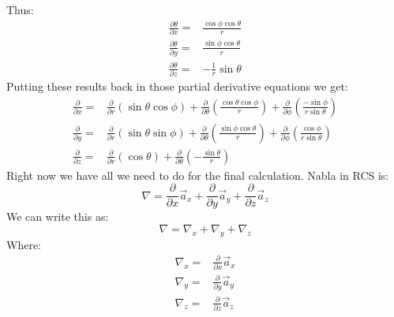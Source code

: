                 Thus:
                \begin{align}
                    \frac{\partial\theta}{\partial x} = & \frac{\cos\phi\cos\theta}{r} \\
                    \frac{\partial\theta}{\partial y} = & \frac{\sin\phi\cos\theta}{r} \\
                    \frac{\partial\theta}{\partial z} = & -\frac{1}{r}\sin\theta
                \end{align}
                Putting these results back in those partial derivative equations we get:
                \begin{align}
                    \frac{\partial}{\partial x} = & \frac{\partial}{\partial r}\left(\sin\theta\cos\phi\right) 
                                                + \frac{\partial}{\partial \theta}\left(\frac{\cos\theta\cos\phi}{r}\right)
                                                + \frac{\partial}{\partial \phi}\left(\frac{-\sin\phi}{r\sin\theta}\right) \\
                    \frac{\partial}{\partial y} = & \frac{\partial}{\partial r}\left(\sin\theta\sin\phi\right)
                                                + \frac{\partial}{\partial \theta}\left(\frac{\sin\phi\cos\theta}{r}\right) 
                                                + \frac{\partial}{\partial \phi}\left(\frac{\cos\phi}{r\sin\theta}\right) \\
                    \frac{\partial}{\partial z} = & \frac{\partial}{\partial r}\left(\cos\theta\right) + \frac{\partial}{\partial \theta}\left(-\frac{\sin\theta}{r}\right)
                \end{align}
                Right now we have all we need to do for the final calculation. Nabla in RCS is:
                $$\nabla = \frac{\partial}{\partial x}\vec{a}_x + \frac{\partial}{\partial y}\vec{a}_y + \frac{\partial}{\partial z}\vec{a}_z$$
                We can write this as:
                $$\nabla = \nabla_x + \nabla_y + \nabla_z$$
                Where:
                \begin{align*}
                    \nabla_x = & \frac{\partial}{\partial x}\vec{a}_x \\
                    \nabla_y = & \frac{\partial}{\partial y}\vec{a}_y \\ 
                    \nabla_z = & \frac{\partial}{\partial z}\vec{a}_z \\
                \end{align*}
